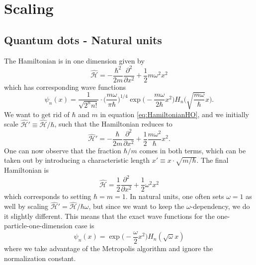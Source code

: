 \chapter{Scaling}

\section{Quantum dots - Natural units}
The Hamiltonian is in one dimension given by
\begin{equation}
\hat{\mathcal{H}}=-\frac{\hbar^2}{2m}\frac{\partial^2}{\partial x^2}+\frac{1}{2}m\omega^2x^2
\label{eq:HamiltonianHO}
\end{equation}
which has corresponding wave functions
\begin{equation}
\psi_n(x)=\frac{1}{\sqrt{2^nn!}}\cdot\bigg(\frac{m\omega}{\pi\hbar}\bigg)^{1/4}\exp\Big(-\frac{m\omega}{2\hbar}x^2\Big)H_n\Big(\sqrt{\frac{m\omega}{\hbar}}x\Big).
\end{equation}
We want to get rid of $\hbar$ and $m$ in equation \eqref{eq:HamiltonianHO}, and we initially scale  $\hat{\mathcal{H}}'\equiv \hat{\mathcal{H}}/\hbar$, such that the Hamiltonian reduces to
\begin{equation}
\hat{\mathcal{H}}'=-\frac{\hbar}{2m}\frac{\partial^2}{\partial x^2}+\frac{1}{2}\frac{m\omega^2}{\hbar}x^2.
\end{equation}
One can now observe that the fraction $\hbar/m$ comes in both terms, which can be taken out by introducing a characteristic length $x'\equiv x\cdot\sqrt{m/\hbar}$. The final Hamiltonian is
\begin{equation}
\hat{\mathcal{H}}=\frac{1}{2}\frac{\partial^2}{\partial x^2}+\frac{1}{2}\omega^2x^2
\end{equation}
which corresponds to setting $\hbar=m=1$. In natural units, one often sets $\omega=1$ as well by scaling $\hat{\mathcal{H}}'=\hat{\mathcal{H}}/\hbar\omega$, but since we want to keep the $\omega$-dependency, we do it slightly different. This means that the exact wave functions for the one-particle-one-dimension case is
\begin{equation}
\psi_n(x)=\exp\Big(-\frac{\omega}{2}x^2\Big)H_n(\sqrt{\omega}x)
\end{equation}
where we take advantage of the Metropolis algorithm and ignore the normalization constant. 

\newpage
